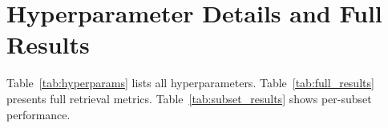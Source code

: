 \documentclass{article}
\begin{document}






\appendix

\section{Hyperparameter Details and Full Results}
\label{app:hyperparams}

Table~\ref{tab:hyperparams} lists all hyperparameters. Table~\ref{tab:full_results} presents full retrieval metrics. Table~\ref{tab:subset_results} shows per-subset performance.
\end{document}
